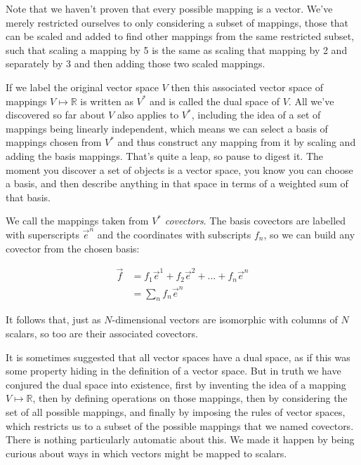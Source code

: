 Note that we haven't proven that every possible mapping is a vector. We've merely restricted ourselves to only considering a subset of mappings, those that can be scaled and added to find other mappings from the same restricted subset, such that scaling a mapping by 5 is the same as scaling that mapping by 2 and separately by 3 and then adding those two scaled mappings.

If we label the original vector space $V$ then this associated vector space of mappings $V \mapsto \mathbb{R}$ is written as $V^*$ and is called the dual space of $V$. All we've discovered so far about $V$ also applies to $V^*$, including the idea of a set of mappings being linearly independent, which means we can select a basis of mappings chosen from $V^*$ and thus construct any mapping from it by scaling and adding the basis mappings. That's quite a leap, so pause to digest it. The moment you discover a set of objects is a vector space, you know you can choose a basis, and then describe anything in that space in terms of a weighted sum of that basis.

We call the mappings taken from $V^*$ \textit{covectors}. The basis covectors are labelled with superscripts $\vec{e}^n$ and the coordinates with subscripts $f_n$, so we can build any covector from the chosen basis:

\begin{equation}
    \begin{split}
    \vec{f} &= f_1 \vec{e}^1 + f_2 \vec{e}^2 + ... + f_n \vec{e}^n \\
            &= \sum_n f_n \vec{e}^n
    \end{split}
\end{equation}

It follows that, just as $N$-dimensional vectors are isomorphic with columns of $N$ scalars, so too are their associated covectors.

It is sometimes suggested that all vector spaces have a dual space, as if this was some property hiding in the definition of a vector space. But in truth we have conjured the dual space into existence, first by inventing the idea of a mapping $V \mapsto \mathbb{R}$, then by defining operations on those mappings, then by considering the set of all possible mappings, and finally by imposing the rules of vector spaces, which restricts us to a subset of the possible mappings that we named covectors. There is nothing particularly automatic about this. We made it happen by being curious about ways in which vectors might be mapped to scalars.

